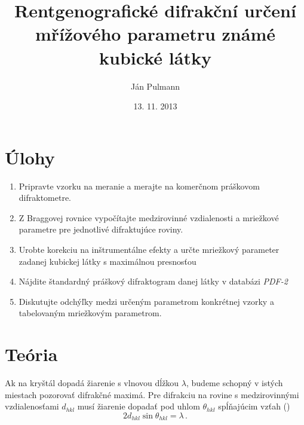 \documentclass[a4paper, 10pt]{article}
\begin{document}
\title{Rentgenografické difrakční určení mřížového parametru známé kubické látky}
\author{Ján Pulmann}
\date{13. 11. 2013}
\maketitle
\section*{Úlohy}
\begin{enumerate}

	\item Pripravte vzorku na meranie a merajte na komerčnom práškovom difraktometre. 
	\item Z Braggovej rovnice vypočítajte medzirovinné vzdialenosti a mriežkové parametre pre jednotlivé difraktujúce roviny.
    \item Urobte korekciu na inštrumentálne efekty a určte mriežkový parameter zadanej kubickej látky s maximálnou presnosťou
    \item Nájdite štandardný práškový difraktogram danej látky v databázi {\it PDF-2}
    \item Diskutujte odchýľky medzi určeným parametrom konkrétnej vzorky a tabelovaným mriežkovým parametrom.

 \end{enumerate}
 
\section*{Teória}
Ak na kryštál dopadá žiarenie s vlnovou dĺžkou $\lambda$, budeme schopný v istých miestach pozorovať difrakčné maximá. Pre difrakciu na rovine s medzirovinnými vzdialenosťami $d_{hkl}$ musí žiarenie dopadať pod uhlom $\theta_{hkl}$ spĺňajúcim vzťah (\cite{stud}) 
\begin{equation}
\label{eq:teor:bragg}
2 d_{hkl} \sin\theta_{hkl} = \lambda\,.
\end{equation}
\end{document}
